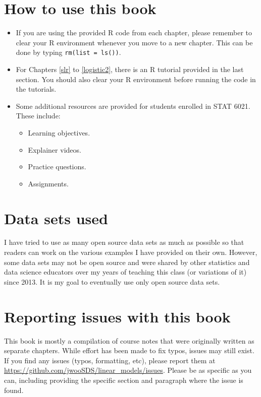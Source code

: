 \documentclass[
]{book}
\providecommand{\tightlist}{%
  \setlength{\itemsep}{0pt}\setlength{\parskip}{0pt}}
\begin{document}
\section*{How to use this book}\label{how-to-use-this-book}

\begin{itemize}
\item
  If you are using the provided R code from each chapter, please remember to clear your R environment whenever you move to a new chapter. This can be done by typing \texttt{rm(list\ =\ ls())}.
\item
  For Chapters \ref{slr} to \ref{logistic2}, there is an R tutorial provided in the last section. You should also clear your R environment before running the code in the tutorials.
\item
  Some additional resources are provided for students enrolled in STAT 6021. These include:

  \begin{itemize}
  \tightlist
  \item
    Learning objectives.
  \item
    Explainer videos.
  \item
    Practice questions.
  \item
    Assignments.
  \end{itemize}
\end{itemize}

\section*{Data sets used}\label{data-sets-used}

I have tried to use as many open source data sets as much as possible so that readers can work on the various examples I have provided on their own. However, some data sets may not be open source and were shared by other statistics and data science educators over my years of teaching this class (or variations of it) since 2013. It is my goal to eventually use only open source data sets.

\section*{Reporting issues with this book}\label{reporting-issues-with-this-book}

This book is mostly a compilation of course notes that were originally written as separate chapters. While effort has been made to fix typos, issues may still exist. If you find any issues (typos, formatting, etc), please report them at \url{https://github.com/jwooSDS/linear_models/issues}. Please be as specific as you can, including providing the specific section and paragraph where the issue is found.
\end{document}

